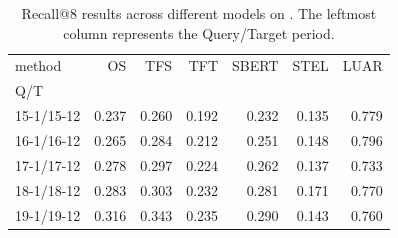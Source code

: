 \begin{table}[th]
    \centering
\begin{tabular}{lrrrrrr}
    \toprule
method & OS & TFS & TFT & SBERT & STEL & LUAR \\
Q/T &  &  &  &  &  &  \\
\midrule
15-1/15-12 & 0.237 & 0.260 & 0.192 & 0.232 & 0.135 & 0.779 \\
16-1/16-12 & 0.265 & 0.284 & 0.212 & 0.251 & 0.148 & 0.796 \\
17-1/17-12 & 0.278 & 0.297 & 0.224 & 0.262 & 0.137 & 0.733 \\
18-1/18-12 & 0.283 & 0.303 & 0.232 & 0.281 & 0.171 & 0.770 \\
19-1/19-12 & 0.316 & 0.343 & 0.235 & 0.290 & 0.143 & 0.760 \\
\bottomrule
\end{tabular}
    \caption{Recall@8 results across different models on \DSfixeddelta{}. The leftmost column represents the Query/Target period.}
    \label{tab:temporal_fixed}
\end{table}

